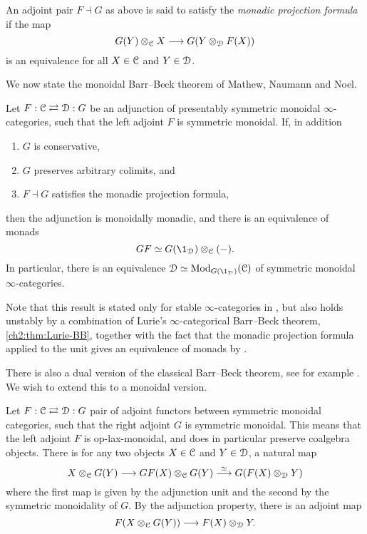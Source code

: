 \begin{definition}
    An adjoint pair $F\dashv G$ as above is said to satisfy the \emph{monadic projection formula} if the map 
    \[G(Y)\otimes_{\EuScript{C}} X \longrightarrow G(Y\otimes_{\EuScript{D}} F(X))\]
    is an equivalence for all $X\in \EuScript{C}$ and $Y\in \EuScript{D}$. 
\end{definition}

We now state the monoidal Barr--Beck theorem of Mathew, Naumann and Noel. 

\begin{theorem}
    \label{ch2:thm:monoidal-BB}
    Let $F:\EuScript{C}\rightleftarrows \EuScript{D}:G$ be an adjunction of presentably symmetric monoidal $\infty$-categories, such that the left adjoint $F$ is symmetric monoidal. If, in addition
    \begin{enumerate}
        \item $G$ is conservative,
        \item $G$ preserves arbitrary colimits, and
        \item $F\dashv G$ satisfies the monadic projection formula,
    \end{enumerate}
    then the adjunction is monoidally monadic, and there is an equivalence of monads 
    \[GF \simeq G(\1_\D)\otimes_\C(-).\]
    In particular, there is an equivalence $\D\simeq \Mod_{G(\1_\D)}(\C)$ of symmetric monoidal $\infty$-categories. 
\end{theorem}

\begin{remark}
    Note that this result is stated only for stable $\infty$-categories in \cite{mathew-naumann-noel_2017}, but also holds unstably by a combination of Lurie's $\infty$-categorical Barr--Beck theorem, \cref{ch2:thm:Lurie-BB}, together with the fact that the monadic projection formula applied to the unit gives an equivalence of monads by \cite[3.6]{elmanto-kolderup_2020}. 
\end{remark}

There is also a dual version of the classical Barr--Beck theorem, see for example \cite[4.5]{brantner-mathew_2023}. We wish to extend this to a monoidal version. 

Let $F:\EuScript{C}\rightleftarrows \EuScript{D}:G$ pair of adjoint functors between symmetric monoidal categories, such that the right adjoint $G$ is symmetric monoidal. This means that the left adjoint $F$ is op-lax-monoidal, and does in particular preserve coalgebra objects. There is for any two objects $X\in \EuScript{C}$ and $Y\in \EuScript{D}$, a natural map
\[X\otimes_{\EuScript{C}} G(Y)\longrightarrow GF(X)\otimes_{\EuScript{C}} G(Y) \overset{\simeq}{\longrightarrow} G(F(X)\otimes_{\EuScript{D}} Y)\]
where the first map is given by the adjunction unit and the second by the symmetric monoidality of $G$. By the adjunction property, there is an adjoint map 
\[F(X\otimes_{\EuScript{C}} G(Y)) \longrightarrow F(X)\otimes_{\EuScript{D}} Y .\]

